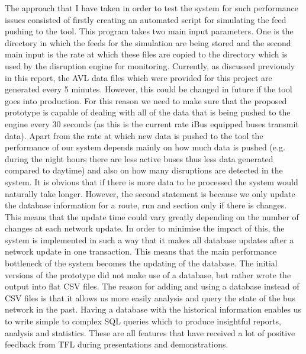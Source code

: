 The approach that I have taken in order to test the system for such performance issues consisted of firstly creating an automated script for simulating the feed pushing to the tool. This program takes two main input parameters. One is the directory in which the feeds for the simulation are being stored and the second main input is the rate at which these files are copied to the directory which is used by the disruption engine for monitoring. Currently, as discussed previously in this report, the AVL data files which were provided for this project are generated every 5 minutes. However, this could be changed in future if the tool goes into production. For this reason we need to make sure that the proposed prototype is capable of dealing with all of the data that is being pushed to the engine every 30 seconds (as this is the current rate iBus equipped buses transmit data). Apart from the rate at which new data is pushed to the tool the performance of our system depends mainly on how much data is pushed (e.g. during the night hours there are less active buses thus less data generated compared to daytime) and also on how many disruptions are detected in the system. It is obvious that if there is more data to be processed the system would naturally take longer. However, the second statement is because we only update the database information for a route, run and section only if there is changes. This means that the update time could vary greatly depending on the number of changes at each network update. In order to minimise the impact of this, the system is implemented in such a way that it makes all database updates after a network update in one transaction. This means that the main performance bottleneck of the system becomes the updating of the database. The initial versions of the prototype did not make use of a database, but rather wrote the output into flat CSV files. The reason for adding and using a database instead of CSV files is that it allows us more easily analysis and query the state of the bus network in the past. Having a database with the historical information enables us to write simple to complex SQL queries which to produce insightful reports, analysis and statistics. These are all features that have received a lot of positive feedback from TFL during presentations and demonstrations.

